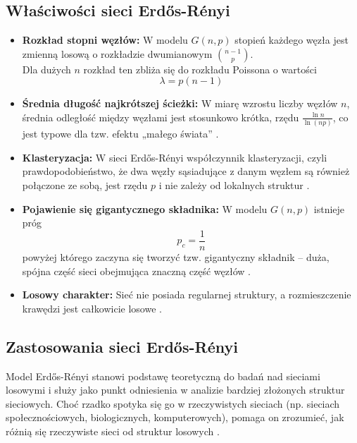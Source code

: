 \subsection{Właściwości sieci Erdős-Rényi}
\begin{itemize}
      \item \textbf{Rozkład stopni węzłów:} W modelu $G(n, p)$ stopień każdego węzła jest zmienną losową o rozkładzie dwumianowym $\binom{n - 1}{p}$.
            \\ Dla dużych $n$ rozkład ten zbliża się do rozkładu Poissona o wartości \cite{Erdos1960}
            \begin{equation}
                  \lambda = p(n - 1)
                  \label{eq:vertex-degree-distribution}
            \end{equation}
            \newpage
      \item \textbf{Średnia długość najkrótszej ścieżki:} W miarę wzrostu liczby węzłów $n$, średnia odległość między węzłami jest stosunkowo krótka, rzędu $\frac{\ln n}{\ln (np)}$,
            co jest typowe dla tzw. efektu „małego świata” \cite{Newman2003}.
      \item \textbf{Klasteryzacja:} W sieci Erdős-Rényi współczynnik klasteryzacji, czyli prawdopodobieństwo, że dwa węzły sąsiadujące z danym węzłem są również połączone ze sobą,
            jest rzędu $p$ i nie zależy od lokalnych struktur \cite{Watts1998}.
      \item \textbf{Pojawienie się gigantycznego składnika:} W modelu $G(n, p)$ istnieje próg
            \begin{equation}
                  p_c = \frac{1}{n}
                  \label{eq:critical-probability}
            \end{equation}
            powyżej którego zaczyna się tworzyć tzw. gigantyczny składnik – duża, spójna część sieci obejmująca znaczną część węzłów \cite{Bollobas2001}.
      \item \textbf{Losowy charakter:} Sieć nie posiada regularnej struktury, a rozmieszczenie krawędzi jest całkowicie losowe \cite{Erdos1960}.
\end{itemize}

\subsection{Zastosowania sieci Erdős-Rényi}
Model Erdős-Rényi stanowi podstawę teoretyczną do badań nad sieciami losowymi i służy jako punkt odniesienia w analizie bardziej złożonych struktur sieciowych.
Choć rzadko spotyka się go w rzeczywistych sieciach (np. sieciach społecznościowych, biologicznych, komputerowych), pomaga on zrozumieć, jak różnią się rzeczywiste sieci od struktur losowych \cite{Newman2003}.

